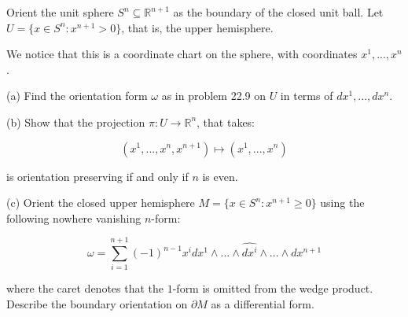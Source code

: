 \documentclass[10pt]{article}
\theoremstyle{nonumberplain}%
\newenvironment{problem}[2][]{\begin{trivlist}
\item[\hskip \labelsep {\bfseries #1}\hskip \labelsep {\bfseries #2.}]}{\end{trivlist}}
\begin{document}
\begin{problem}{Question 5}

Orient the unit sphere $S^n \subseteq \mathbb{R}^{n+1}$ as the boundary of the closed unit ball. Let $U = \{ x \in S^n : x^{n+1} > 0 \}$, that is, the upper hemisphere.

We notice that this is a coordinate chart on the sphere, with coordinates $x^1,...,x^n$. 

(a) Find the orientation form $\omega$ as in problem 22.9 on $U$ in terms of $dx^1,...,dx^n$.

(b) Show that the projection $\pi: U \to \mathbb{R}^n$, that takes:

$$ (x^1,...,x^n, x^{n+1}) \mapsto ( x^1,...,x^n) $$

is orientation preserving if and only if $n$ is even.

(c) Orient the closed upper hemisphere $M = \{ x \in S^n : x^{n+1} \geq 0 \}$ using the following nowhere vanishing $n$-form:

$$ \omega = \sum_{i=1}^{n+1} (-1)^{n-1} x^i dx^1 \wedge ... \wedge \widehat{dx^i} \wedge ... \wedge dx^{n+1} $$

where the caret denotes that the $1$-form is omitted from the wedge product. Describe the boundary orientation on $\partial M$ as a differential form.

\end{problem}
\end{document}
